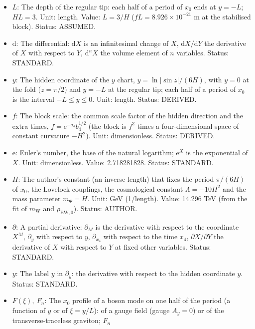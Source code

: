 \documentclass[
  10pt,
]{article}
\providecommand{\tightlist}{%
  \setlength{\itemsep}{0pt}\setlength{\parskip}{0pt}}
\begin{document}
\begin{itemize}
\tightlist
\item
  \(L\): The depth of the regular tip: each half of a period of \(x_0\)
  ends at \(y = -L\); \(HL = 3\). Unit: length. Value: \(L = 3/H\)
  (\(fL = 8.926\times10^{-21}\) m at the stabilised block). Status:
  ASSUMED.
\item
  \(\mathrm{d}\): The differential: \(\mathrm{d}X\) is an infinitesimal
  change of \(X\), \(\mathrm{d}X/\mathrm{d}Y\) the derivative of \(X\)
  with respect to \(Y\), \(\mathrm{d}^nX\) the volume element of \(n\)
  variables. Status: STANDARD.
\item
  \(y\): The hidden coordinate of the \(y\) chart,
  \(y = \ln\lvert\sin z\rvert/(6H)\), with \(y = 0\) at the fold
  (\(z = \pi/2\)) and \(y = -L\) at the regular tip; each half of a
  period of \(x_0\) is the interval \(-L \le y \le 0\). Unit: length.
  Status: DERIVED.
\item
  \(f\): The block scale: the common scale factor of the hidden
  direction and the extra times, \(f = \mathrm{e}^{-a_4}b_4^{1/2}\) (the
  block is \(f^2\) times a four-dimensional space of constant curvature
  \(-H^2\)). Unit: dimensionless. Status: DERIVED.
\item
  \(\mathrm{e}\): Euler's number, the base of the natural logarithm;
  \(\mathrm{e}^{X}\) is the exponential of \(X\). Unit: dimensionless.
  Value: 2.718281828. Status: STANDARD.
\item
  \(H\): The author's constant (an inverse length) that fixes the period
  \(\pi/(6H)\) of \(x_0\), the Lovelock couplings, the cosmological
  constant \(\Lambda = -10H^2\) and the mass parameter \(m_\Psi = H\).
  Unit: GeV (1/length). Value: 14.296 TeV (from the fit of
  \(m_{\mathrm{W}}\) and \(\rho_{\mathrm{EW},0}\)). Status: AUTHOR.
\item
  \(\partial\): A partial derivative: \(\partial_M\) is the derivative
  with respect to the coordinate \(X^M\), \(\partial_y\) with respect to
  \(y\), \(\partial_{x_4}\) with respect to the time \(x_4\),
  \(\partial X/\partial Y\) the derivative of \(X\) with respect to
  \(Y\) at fixed other variables. Status: STANDARD.
\item
  \(y\): The label \(y\) in \(\partial_y\): the derivative with respect
  to the hidden coordinate \(y\). Status: STANDARD.
\item
  \(F(\xi),\ F_n\): The \(x_0\) profile of a boson mode on one half of
  the period (a function of \(y\) or of \(\xi = y/L\)): of a gauge field
  (gauge \(A_y = 0\)) or of the transverse-traceless graviton; \(F_n\)

\end{itemize}
\end{document}

